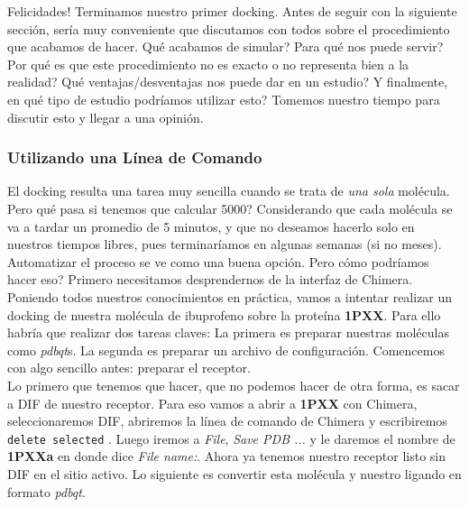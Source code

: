 \documentclass[10pt,letterpaper]{article}
\newcommand{\inlinecode}[1]{
\colorbox{light-gray}{\texttt{#1}}
}
\begin{document}
Felicidades! Terminamos nuestro primer docking. Antes de seguir con la siguiente secci\'on, ser\'ia muy conveniente que discutamos con todos sobre el procedimiento que acabamos de hacer. Qu\'e acabamos de simular? Para qu\'e nos puede servir? Por qu\'e es que este procedimiento no es exacto o no representa bien a la realidad? Qu\'e ventajas/desventajas nos puede dar en un estudio? Y finalmente, en qu\'e tipo de estudio podr\'iamos utilizar esto? Tomemos nuestro tiempo para discutir esto y llegar a una opini\'on.

\subsubsection{Utilizando una L\'inea de Comando}
El docking resulta una tarea muy sencilla cuando se trata de \emph{una sola} mol\'ecula. Pero qu\'e pasa si tenemos que calcular 5000? Considerando que cada mol\'ecula se va a tardar un promedio de 5 minutos, y que no deseamos hacerlo solo en nuestros tiempos libres, pues terminar\'iamos en algunas semanas (si no meses). Automatizar el proceso se ve como una buena opci\'on. Pero c\'omo podr\'iamos hacer eso? Primero necesitamos desprendernos de la interfaz de Chimera.\\

Poniendo todos nuestros conocimientos en pr\'actica, vamos a intentar realizar un docking de nuestra mol\'ecula de ibuprofeno sobre la prote\'ina \textbf{1PXX}. Para ello habr\'ia que realizar dos tareas claves: La primera es preparar nuestras mol\'eculas como \textit{pdbqt}s. La segunda es preparar un archivo de configuraci\'on. Comencemos con algo sencillo antes: preparar el receptor.\\

Lo primero que tenemos que hacer, que no podemos hacer de otra forma, es sacar a DIF de nuestro receptor. Para eso vamos a abrir a \textbf{1PXX} con Chimera, seleccionaremos DIF, abriremos la l\'inea de comando de Chimera y escribiremos \inlinecode{delete selected}. Luego iremos a \emph{File}, \emph{Save PDB ...} y le daremos el nombre de \textbf{1PXXa} en donde dice \emph{File name:}. Ahora ya tenemos nuestro receptor listo sin DIF en el sitio activo. Lo siguiente es convertir esta mol\'ecula y nuestro ligando en formato \emph{pdbqt}.\\
\end{document}
